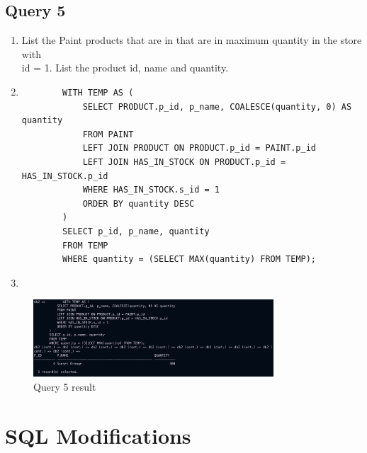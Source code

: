 \documentclass[a4paper,11pt]{article}
\begin{document}
\subsection*{Query 5}
\begin{enumerate}[label=(\alph*)]
    \item List the Paint products that are in that are in maximum quantity in the store with \\id = 1.
        List the product id, name and quantity.
    \item
        \begin{lstlisting}
        WITH TEMP AS (
            SELECT PRODUCT.p_id, p_name, COALESCE(quantity, 0) AS quantity
            FROM PAINT
            LEFT JOIN PRODUCT ON PRODUCT.p_id = PAINT.p_id
            LEFT JOIN HAS_IN_STOCK ON PRODUCT.p_id = HAS_IN_STOCK.p_id
            WHERE HAS_IN_STOCK.s_id = 1
            ORDER BY quantity DESC
        )
        SELECT p_id, p_name, quantity
        FROM TEMP
        WHERE quantity = (SELECT MAX(quantity) FROM TEMP);
        \end{lstlisting}
    \item
\end{enumerate}
\begin{figure}[H]
    \centering
    \includegraphics[width=0.8\textwidth]{Query5.png}
    \caption{Query 5 result}
\end{figure}

\section{SQL Modifications}
\end{document}
